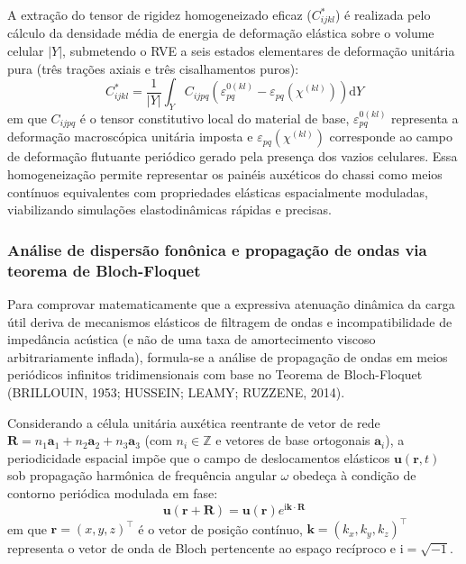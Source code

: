 A extração do tensor de rigidez homogeneizado eficaz ($C_{ijkl}^{*}$) é realizada pelo cálculo da densidade média de energia de deformação elástica sobre o volume celular $|Y|$, submetendo o RVE a seis estados elementares de deformação unitária pura (três trações axiais e três cisalhamentos puros):
\begin{equation}
  C_{ijkl}^{*} = \frac{1}{|Y|} \int_{Y} C_{ijpq} \left( \varepsilon_{pq}^{0(kl)} - \varepsilon_{pq}\!\left(\chi^{(kl)}\right) \right) \mathrm{d}Y
  \label{eq:homog}
\end{equation}
em que $C_{ijpq}$ é o tensor constitutivo local do material de base, $\varepsilon_{pq}^{0(kl)}$ representa a deformação macroscópica unitária imposta e $\varepsilon_{pq}(\chi^{(kl)})$ corresponde ao campo de deformação flutuante periódico gerado pela presença dos vazios celulares. Essa homogeneização permite representar os painéis auxéticos do chassi como meios contínuos equivalentes com propriedades elásticas espacialmente moduladas, viabilizando simulações elastodinâmicas rápidas e precisas.

\subsubsection{Análise de dispersão fonônica e propagação de ondas via teorema de Bloch-Floquet}
\label{subsubsec:bloch}

Para comprovar matematicamente que a expressiva atenuação dinâmica da carga útil deriva de mecanismos elásticos de filtragem de ondas e incompatibilidade de impedância acústica (e não de uma taxa de amortecimento viscoso arbitrariamente inflada), formula-se a análise de propagação de ondas em meios periódicos infinitos tridimensionais com base no Teorema de Bloch-Floquet (BRILLOUIN, 1953; HUSSEIN; LEAMY; RUZZENE, 2014).

Considerando a célula unitária auxética reentrante de vetor de rede $\mathbf{R} = n_1 \mathbf{a}_1 + n_2 \mathbf{a}_2 + n_3 \mathbf{a}_3$ (com $n_i \in \mathbb{Z}$ e vetores de base ortogonais $\mathbf{a}_i$), a periodicidade espacial impõe que o campo de deslocamentos elásticos $\mathbf{u}(\mathbf{r}, t)$ sob propagação harmônica de frequência angular $\omega$ obedeça à condição de contorno periódica modulada em fase:
\begin{equation}
  \mathbf{u}(\mathbf{r} + \mathbf{R}) = \mathbf{u}(\mathbf{r}) e^{\mathrm{i} \mathbf{k} \cdot \mathbf{R}}
  \label{eq:bloch}
\end{equation}
em que $\mathbf{r} = (x, y, z)^\top$ é o vetor de posição contínuo, $\mathbf{k} = (k_x, k_y, k_z)^\top$ representa o vetor de onda de Bloch pertencente ao espaço recíproco e $\mathrm{i} = \sqrt{-1}$.

